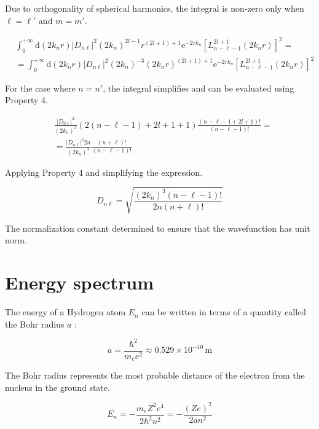 Due to orthogonality of spherical harmonics, the integral is non-zero only when $\ell=\ell'$ and $m=m'$.

\begin{align}
& \int_{0}^{+\infty} \mathrm{d}\left(2 k_{n} r\right)\left|D_{n \ell}\right|^{2}\left(2 k_{n}\right)^{2 l-1} r^{(2 l+1)+1} \mathrm{e}^{-2 r k_{n}}\left[L_{n-\ell-1}^{2 l+1}\left(2 k_{n} r\right)\right]^{2}= \\
& =\int_{0}^{+\infty} \mathrm{d}\left(2 k_{n} r\right)\left|D_{n \ell}\right|^{2}\left(2 k_{n}\right)^{-3}\left(2 k_{n} r\right)^{(2 l+1)+1} \mathrm{e}^{-2 r k_{n}}\left[L_{n-\ell-1}^{2 l+1}\left(2 k_{n} r\right)\right]^{2}
\end{align}

For the case where $n=n'$, the integral simplifies and can be evaluated using Property 4.

\begin{align}
& \frac{\left|D_{n \ell}\right|^{2}}{\left(2 k_{n}\right)^{3}}(2(n-\ell-1)+2 l+1+1) \frac{(n-\ell-1+2 l+1)!}{(n-\ell-1)!}=  \\
& =\frac{\left|D_{n \ell}\right|^{2} 2 n}{\left(2 k_{n}\right)^{3}} \frac{(n+\ell)!}{(n-\ell-1)!}
\end{align}

Applying Property 4 and simplifying the expression.

\begin{equation}
D_{n \ell}=\sqrt{\frac{\left(2 k_{n}\right)^{3}(n-\ell-1)!}{2 n(n+\ell)!}}
\end{equation}

The normalization constant determined to ensure that the wavefunction has unit norm.

\section{Energy spectrum}
The energy of a Hydrogen atom $E_{n}$ can be written in terms of a quantity called the Bohr radius $a$ :

\begin{equation}
a=\frac{\hbar^{2}}{m_{e} e^{2}} \approx 0.529 \times 10^{-10} \, \mathrm{m}
\end{equation}

The Bohr radius represents the most probable distance of the electron from the nucleus in the ground state.

\begin{equation}
E_{n}=-\frac{m_{e} Z^{2} e^{4}}{2 \hbar^{2} n^{2}}=-\frac{(Z e)^{2}}{2 a n^{2}}
\end{equation}

